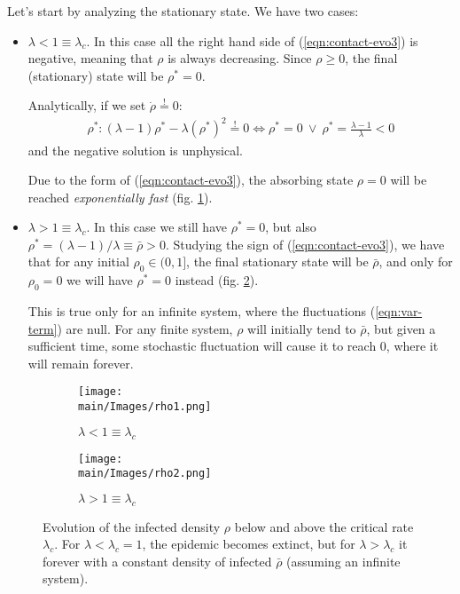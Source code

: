 \documentclass[../../main.tex]{subfiles}
\begin{document}
Let's start by analyzing the stationary state. We have two cases:
\begin{itemize}
    \item $\lambda < 1 \equiv \lambda_c$. In this case all the right hand side of (\ref{eqn:contact-evo3}) is negative, meaning that $\rho$ is always decreasing. Since $\rho \geq 0$, the final (stationary) state will be $\rho^* = 0$.
    
    \medskip

    Analytically, if we set $\dot{\rho} \overset{!}{=} 0$:
    \begin{align*}
        \rho^* \colon (\lambda - 1) \rho^* - \lambda (\rho^*)^2 \overset{!}{=}  0 \Leftrightarrow \rho^* = 0 \> \lor \> \rho^* = \frac{\lambda-1}{\lambda} < 0 
    \end{align*}
    and the negative solution is unphysical.

    \medskip

    Due to the form of (\ref{eqn:contact-evo3}), the absorbing state $\rho=0$ will be reached \textit{exponentially fast} (fig. \ref{fig:rho-1}).
    \item $\lambda > 1 \equiv \lambda_c$. In this case we still have $\rho^* = 0$, but also $\rho^* = (\lambda -1)/\lambda \equiv \bar{\rho} > 0$. Studying the sign of (\ref{eqn:contact-evo3}), we have that for any initial $\rho_0 \in (0,1]$, the final stationary state will be $\bar{\rho}$, and only for $\rho_0 = 0$ we will have $\rho^* = 0$ instead (fig. \ref{fig:rho-2}).

    \medskip

    This is true only for an infinite system, where the fluctuations (\ref{eqn:var-term}) are null. For any finite system, $\rho$ will initially tend to $\bar{\rho}$, but given a sufficient time, some stochastic fluctuation will cause it to reach $0$, where it will remain forever.
\end{itemize}

\begin{figure}[H]
    \centering
    \begin{subfigure}[t]{0.45\textwidth}
        \centering
        \texttt{[image: \\main/Images/rho1.png]}
        \caption{$\lambda < 1 \equiv \lambda_c$}
        \label{fig:rho-1}
    \end{subfigure}
    \hfill
    \begin{subfigure}[t]{0.45\textwidth}
        \centering
        \texttt{[image: \\main/Images/rho2.png]}
        \caption{$ \lambda > 1 \equiv \lambda_c$}
        \label{fig:rho-2}
    \end{subfigure}
       \caption{Evolution of the infected density $\rho$ below and above the critical rate $\lambda_c$. For $\lambda < \lambda_c = 1$, the epidemic becomes extinct, but for $\lambda > \lambda_c$ it  forever with a constant density of infected $\bar{\rho}$ (assuming an infinite system).}
       \label{fig:rho1-2}
\end{figure}
\end{document}
